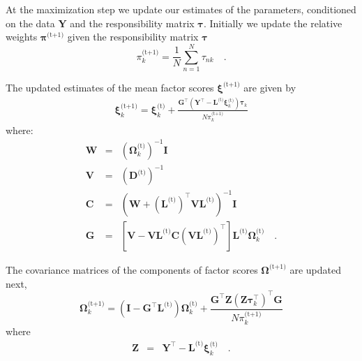 \documentclass[twocolumn]{aastex61}
\newcommand{\vect}[1]{\boldsymbol{\mathbf{#1}}}
\renewcommand{\vec}[1]{\vect{#1}}
\newcommand{\weight}{\pi}
\newcommand{\data}{\textbf{Y}}
\newcommand{\vecdata}{\vec\data}
\newcommand{\nextstep}{^\textrm{(t+1)}}
\newcommand{\thisstep}{^\textrm{(t)}}
\newcommand{\transpose}{^\intercal}
\newcommand{\eye}{\textbf{I}}
\newcommand{\factorloads}{\textbf{L}}
\newcommand{\specificvariance}{\vec{D}}
\newcommand{\scoremeans}{\vec\xi}
\newcommand{\scorecovs}{\vec\Omega}
\newcommand{\NumData}{N}
\newcommand{\numdata}{n}
\newcommand{\numcomponents}{k}
\begin{document}




At the maximization step we update our estimates of the parameters,
conditioned on the data $\vecdata$ and the responsibility matrix $\vec\tau$.
Initially we update the relative weights $\vec\weight\nextstep$ given
the responsibility matrix $\vec\tau$
\begin{equation}
	\weight_\numcomponents\nextstep = \frac{1}{\NumData} \sum_{\numdata=1}^{\NumData}\tau_{\numdata\numcomponents} \quad .
\end{equation}



The updated estimates of the mean factor scores 
$\scoremeans\nextstep$ are given by
\begin{eqnarray}
	\scoremeans_\numcomponents\nextstep = \scoremeans_\numcomponents\thisstep + \frac{\vec{G}\transpose(\vecdata\transpose - \factorloads\thisstep\scoremeans_\numcomponents\thisstep)\vec\tau_\numcomponents}{\NumData\weight_\numcomponents\nextstep}
\end{eqnarray}
\noindent{}where:
\begin{eqnarray}
	\vec{W} &=& (\scorecovs_\numcomponents\thisstep)^{-1}\eye \\
	\vec{V} &=& \left(\specificvariance\thisstep\right)^{-1} \\
	\vec{C} &=& (\vec{W} + (\factorloads\thisstep)\transpose\vec{V}\factorloads\thisstep)^{-1}\eye \\
	\vec{G} &=& \left[\vec{V} - \vec{V}\factorloads\thisstep\vec{C}\left(\vec{V}\factorloads\thisstep\right)\transpose\right]\factorloads\thisstep\scorecovs_k\thisstep \quad .
\end{eqnarray}

The covariance matrices of the components of factor scores $\scorecovs\nextstep$
are updated next,
\begin{equation}
	\scorecovs_\numcomponents\nextstep = \left(\eye - \vec{G}\transpose\factorloads\thisstep\right)\scorecovs_\numcomponents\thisstep + \frac{\vec{G}\transpose\vec{Z}\left(\vec{Z}\vec\tau_\numcomponents\transpose\right)\transpose\vec{G}}{N\weight_\numcomponents\nextstep}
\end{equation}
\noindent{}where
\begin{eqnarray}
	\vec{Z} &=& \vecdata\transpose - \factorloads\thisstep\scoremeans_\numcomponents\thisstep \quad .
\end{eqnarray}
\end{document}
